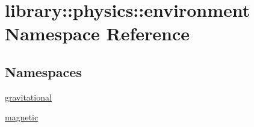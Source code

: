 \hypertarget{namespacelibrary_1_1physics_1_1environment}{}\section{library\+:\+:physics\+:\+:environment Namespace Reference}
\label{namespacelibrary_1_1physics_1_1environment}
\subsection*{Namespaces}
\begin{DoxyCompactItemize}
\item 
 \hyperlink{namespacelibrary_1_1physics_1_1environment_1_1gravitational}{gravitational}
\item 
 \hyperlink{namespacelibrary_1_1physics_1_1environment_1_1magnetic}{magnetic}
\end{DoxyCompactItemize}
